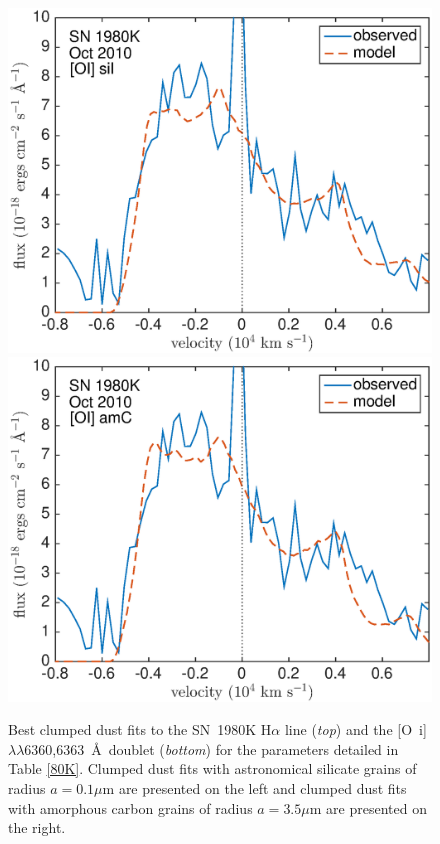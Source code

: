 \begin{figure}[!t]
\includegraphics[scale=0.4,clip=true, trim=20 0 40 20]{chapters/chapter6/figs/80K/clumped/OI}
\includegraphics[scale=0.4,clip=true, trim=20 0 40 20]{chapters/chapter6/figs/80K/clumped/OI_amC}
\caption{Best clumped dust fits to the SN~1980K H$\alpha$ line ({\em top}) and the [O~{\sc i}]$\lambda\lambda$6360,6363~\AA\ doublet ({\em bottom}) for the parameters detailed in Table \ref{80K}.  Clumped dust fits with astronomical silicate grains of radius $a=0.1 \mu$m are presented on the left and clumped dust fits with amorphous carbon grains of radius $a=3.5 \mu$m are presented on the right.}
\label{80K_clumped}
\end{figure}

